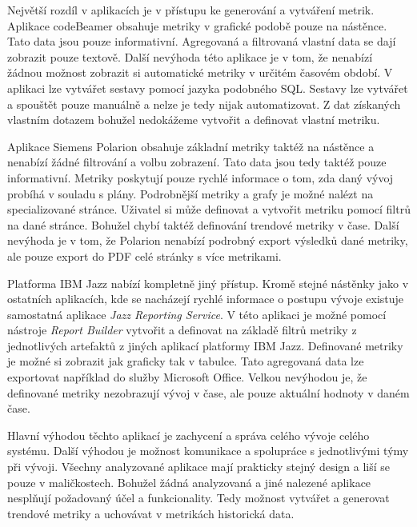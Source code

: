 \documentclass[czech,master]{diploma}
\begin{document}
Největší rozdíl v aplikacích je v přístupu ke generování a vytváření metrik. Aplikace codeBeamer obsahuje metriky v grafické podobě pouze na nástěnce. Tato data jsou pouze informativní. Agregovaná a filtrovaná vlastní data se dají zobrazit pouze textově. Další nevýhoda této aplikace je v tom, že nenabízí žádnou možnost zobrazit si automatické metriky v určitém časovém období. V aplikaci lze vytvářet sestavy pomocí jazyka podobného SQL. Sestavy lze vytvářet a spouštět pouze manuálně a nelze je tedy nijak automatizovat. Z dat získaných vlastním dotazem bohužel nedokážeme vytvořit a definovat vlastní metriku.

Aplikace Siemens Polarion obsahuje základní metriky taktéž na nástěnce a nenabízí žádné filtrování a volbu zobrazení. Tato data jsou tedy taktéž pouze informativní. Metriky poskytují pouze rychlé informace o tom, zda daný vývoj probíhá v souladu s plány. Podrobnější metriky a grafy je možné nalézt na specializované stránce. Uživatel si může definovat a vytvořit metriku pomocí filtrů na dané stránce. Bohužel chybí taktéž definování trendové metriky v čase. Další nevýhoda je v tom, že Polarion nenabízí podrobný export výsledků dané metriky, ale pouze export do PDF celé stránky s více metrikami.

Platforma IBM Jazz nabízí kompletně jiný přístup. Kromě stejné nástěnky jako v ostatních aplikacích, kde se nacházejí rychlé informace o postupu vývoje existuje samostatná aplikace \textit{Jazz Reporting Service}. V této aplikaci je možné pomocí nástroje \textit{Report Builder} vytvořit a definovat na základě filtrů metriky z jednotlivých artefaktů z jiných aplikací platformy IBM Jazz. Definované metriky je možné si zobrazit jak graficky tak v tabulce. Tato agregovaná data lze exportovat například do služby Microsoft Office. Velkou nevýhodou je, že definované metriky nezobrazují vývoj v čase, ale pouze aktuální hodnoty v daném čase.

Hlavní výhodou těchto aplikací je zachycení a správa celého vývoje celého systému. Další výhodou je možnost komunikace a spolupráce s jednotlivými týmy při vývoji. Všechny analyzované aplikace mají prakticky stejný design a liší se pouze v maličkostech. Bohužel žádná analyzovaná a jiné nalezené aplikace nesplňují požadovaný účel a funkcionality. Tedy možnost vytvářet a generovat trendové metriky a uchovávat v metrikách historická data.
\end{document}
